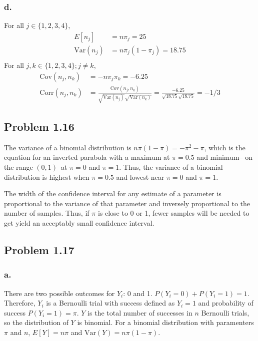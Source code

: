 \documentclass{article}
\begin{document}
\subsubsection*{d.}
For all $j \in \{1, 2, 3, 4\}$,
\begin{align*}
E[n_j] &= n\pi_j = 25  \\
\mathrm{Var}(n_j) &= n\pi_j(1-\pi_j) = 18.75 \\
\end{align*}
For all $j, k \in \{1, 2, 3, 4\}; j\neq k$, 
\begin{align*}
\mathrm{Cov}(n_j, n_k) &= -n\pi_j\pi_k = -6.25\\
\mathrm{Corr}(n_j, n_k) &= \frac{\mathrm{Cov}(n_j, n_k)}{\sqrt{\mathrm{Var}(n_j)}\sqrt{\mathrm{Var}(n_k)}} = \frac{-6.25}{\sqrt{18.75}\sqrt{18.75}} = -1/3
\end{align*}

\subsection{Problem 1.16}
The variance of a binomial distribution is $n\pi(1-\pi) = -\pi^2-\pi$, which is the equation for an inverted parabola with a maximum at $\pi = 0.5$ and minimum-- on the range $(0,1)$--at $\pi=0$ and $\pi=1$. Thus, the variance of a binomial distribution is highest when $\pi=0.5$ and lowest near $\pi=0$ and $\pi=1$. 

The width of the confidence interval for any estimate of a parameter is proportional to the variance of that parameter and inversely proportional to the number of samples. Thus, if $\pi$ is close to 0 or 1, fewer samples will be needed to get yield an acceptably small confidence interval. 

\pagebreak
\subsection{Problem 1.17}
\subsubsection{a.}
There are two possible outcomes for $Y_i$: 0 and 1. $P(Y_i=0) + P(Y_i=1) = 1$. Therefore, $Y_i$ is a Bernoulli trial with success defined as $Y_i=1$ and probability of success $P(Y_i=1)=\pi$. $Y$ is the total number of successes in $n$ Bernoulli trials, so the distribution of $Y$ is binomial. For a binomial distribution with paramenters $\pi$ and $n$, $E[Y] = n\pi$ and $\mathrm{Var}(Y) = n\pi(1-\pi)$. 
\end{document}

